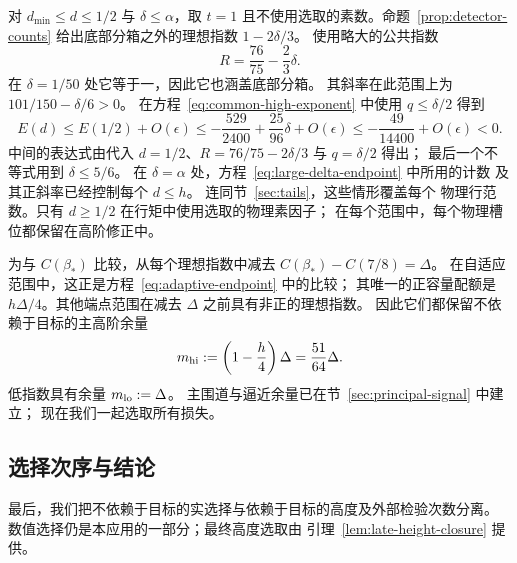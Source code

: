 对 \(d_{\min}\le d\le1/2\) 与 \(\delta\le\alpha\)，取 \(t=1\)
且不使用选取的素数。命题~\ref{prop:detector-counts}
给出底部分箱之外的理想指数 \(1-2\delta/3\)。
使用略大的公共指数
\[
 R=\frac{76}{75}-\frac23\delta.
\]
在 \(\delta=1/50\) 处它等于一，因此它也涵盖底部分箱。
其斜率在此范围上为 \(101/150-\delta/6>0\)。
在方程~\eqref{eq:common-high-exponent} 中使用 \(q\le\delta/2\) 得到
\begin{equation}
 E(d)\le E(1/2)+O(\epsilon)
 \le-\frac{529}{2400}+\frac{25}{96}\delta+O(\epsilon)
 \le-\frac{49}{14400}+O(\epsilon)<0.
 \label{eq:adaptive-intermediate}
\end{equation}
中间的表达式由代入
\(d=1/2\)、\(R=76/75-2\delta/3\) 与 \(q=\delta/2\) 得出；
最后一个不等式用到 \(\delta\le5/6\)。
在 \(\delta=\alpha\) 处，方程~\eqref{eq:large-delta-endpoint} 中所用的计数
及其正斜率已经控制每个 \(d\le h\)。
连同节~\ref{sec:tails}，这些情形覆盖每个
物理行范数。只有 \(d\ge1/2\) 在行矩中使用选取的物理素因子；
在每个范围中，每个物理槽位都保留在高阶修正中。

为与 \(C(\beta_*)\) 比较，从每个理想指数中减去
\(C(\beta_*)-C(7/8)=\Delta\)。
在自适应范围中，这正是方程~\eqref{eq:adaptive-endpoint} 中的比较；
其唯一的正容量配额是 \(h\Delta/4\)。其他端点范围在减去 \(\Delta\)
之前具有非正的理想指数。
因此它们都保留不依赖于目标的主高阶余量
\[
 m_{\rm hi}:=\left(1-\frac h4\right)\Delta
             =\frac{51}{64}\Delta.
\]
低指数具有余量 \(m_{\rm lo}:=\Delta\)。
主围道与逼近余量已在节~\ref{sec:principal-signal} 中建立；
现在我们一起选取所有损失。

\subsection{选择次序与结论}

最后，我们把不依赖于目标的实选择与依赖于目标的高度及外部检验次数分离。
数值选择仍是本应用的一部分；最终高度选取由
引理~\ref{lem:late-height-closure} 提供。

